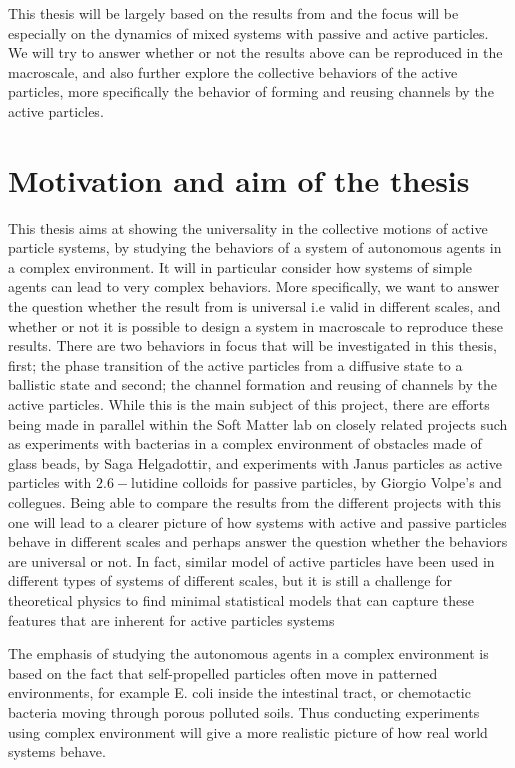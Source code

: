 This thesis will be largely based on the results from \citeauthor{nilsson2017metastable} and 
the focus will be especially on the dynamics of mixed systems with passive and active particles. 
We will try to answer whether or not the results above can be reproduced in the macroscale, 
and also further explore the collective behaviors of the active particles, more specifically 
the behavior of forming and reusing channels by the active particles. 

\newpage
\section{Motivation and aim of the thesis}

This thesis aims at showing the universality in the collective motions of active particle systems, 
by studying the behaviors of a system of autonomous agents in a complex environment. 
It will in particular consider how systems of simple agents can lead to very complex behaviors. 
More specifically, we want to answer the question whether the result from \cite{nilsson2017metastable} is 
universal i.e valid in different scales, and whether or not it is possible to design a system in 
macroscale to reproduce these results. There are two behaviors in focus that will be investigated 
in this thesis, first; the phase transition of the active particles from a diffusive state to a ballistic state and 
second; the channel formation and reusing of channels by the active particles. While this is the main subject of 
this project, there are efforts being made in parallel within the Soft Matter lab on closely related projects such as 
experiments with bacterias in a complex environment of obstacles made of glass beads, by Saga Helgadottir, and 
experiments with Janus particles as active particles with $\num{2.6}-$lutidine colloids for passive particles, by 
Giorgio Volpe's and collegues. Being able to compare the results from the different projects with this one 
will lead to a clearer picture of how systems with active and passive particles behave in different 
scales and perhaps answer the question whether the behaviors are universal or not. In fact, similar model 
of active particles have been used in different types of systems of different scales, but it is still a challenge 
for theoretical physics to find minimal statistical models that can capture these features that are inherent 
for active particles systems\cite{toner2005hydrodynamics, li2008minimal, bertin2009hydrodynamic}

The emphasis of studying the autonomous agents in a complex environment is based on the 
fact that self-propelled particles often move in patterned environments, for example E. coli 
inside the intestinal tract\cite{berg2008coli}, or chemotactic bacteria moving through porous 
polluted soils\cite{ford2007role}. Thus conducting experiments using complex environment 
will give a more realistic picture of how real world systems behave.
 
